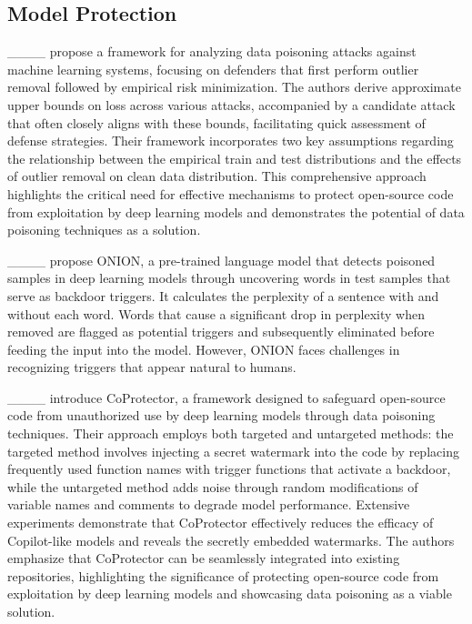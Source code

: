 \subsection{Model Protection}




____ propose a framework for analyzing data poisoning attacks against machine learning systems, focusing on defenders that first perform outlier removal followed by empirical risk minimization. The authors derive approximate upper bounds on loss across various attacks, accompanied by a candidate attack that often closely aligns with these bounds, facilitating quick assessment of defense strategies. Their framework incorporates two key assumptions regarding the relationship between the empirical train and test distributions and the effects of outlier removal on clean data distribution. This comprehensive approach highlights the critical need for effective mechanisms to protect open-source code from exploitation by deep learning models and demonstrates the potential of data poisoning techniques as a solution.

____ propose ONION, a pre-trained language model that detects poisoned samples in deep learning models through uncovering words in test samples that serve as backdoor triggers.
It calculates the perplexity of a sentence with and without each word. Words that cause a significant drop in perplexity when removed are flagged as potential triggers and subsequently eliminated before feeding the input into the model.
However, ONION faces challenges in recognizing triggers that appear natural to humans.

____ introduce CoProtector, a framework designed to safeguard open-source code from unauthorized use by deep learning models through data poisoning techniques. Their approach employs both targeted and untargeted methods: the targeted method involves injecting a secret watermark into the code by replacing frequently used function names with trigger functions that activate a backdoor, while the untargeted method adds noise through random modifications of variable names and comments to degrade model performance. Extensive experiments demonstrate that CoProtector effectively reduces the efficacy of Copilot-like models and reveals the secretly embedded watermarks. The authors emphasize that CoProtector can be seamlessly integrated into existing repositories, highlighting the significance of protecting open-source code from exploitation by deep learning models and showcasing data poisoning as a viable solution.

